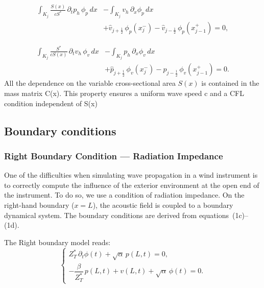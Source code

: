 \documentclass[11pt,a4paper]{report}
\theoremstyle{plain}
\theoremstyle{definition}
\begin{document}
\begin{equation}
\begin{aligned}
\int_{K_j} \frac{S(x)}{cS^\ast}\,
\partial_t p_h \, \phi_p \, dx
&-
\int_{K_j} v_h \, \partial_x \phi_p \, dx \\
&+
\widehat{v}_{j+\frac12}\, \phi_p(x_j^-)
-
\widehat{v}_{j-\frac12}\, \phi_p(x_{j-1}^+)
=0,
\end{aligned}
\label{eq:dg_wave_p}
\end{equation}

\begin{equation}
\begin{aligned}
\int_{K_j} \frac{S^\ast}{cS(x)}\,
\partial_t v_h \, \phi_v \, dx
&-
\int_{K_j} p_h \, \partial_x \phi_v \, dx \\
&+
\widehat{p}_{j+\frac12}\, \phi_v(x_j^-)
-
\widehat{p}_{j-\frac12}\, \phi_v(x_{j-1}^+)
=0.
\end{aligned}
\label{eq:dg_wave_v}
\end{equation}
All the dependence on the variable cross-sectional area $S(x)$ is contained in the mass matrix C(x). 
This property ensures a uniform wave speed c and a CFL condition independent of S(x)

\subsection{Boundary conditions}

\subsubsection{Right Boundary Condition — Radiation Impedance}
One of the difficulties when simulating wave propagation in a wind instrument is to correctly
compute the influence of the exterior environment at the open end of the instrument. \cite{thibault}
To do so, we use a condition of radiation impedance. 
On the right-hand boundary ($x = L$), the acoustic field is coupled to a boundary dynamical system.
The boundary conditions are derived from equations~(1c)--(1d).

The Right boundary model reads:
\begin{equation}
\begin{cases}
Z^\ast_T\,\partial_t \phi(t)
+ \sqrt{\alpha}\, p(L,t) = 0,
\\[0.4em]
-\dfrac{\beta}{Z^\ast_T}\, p(L,t)
+ v(L,t)
+ \sqrt{\alpha}\,\phi(t) = 0.
\end{cases}
\label{eq:bc_ode_pde}
\end{equation}
\end{document}
